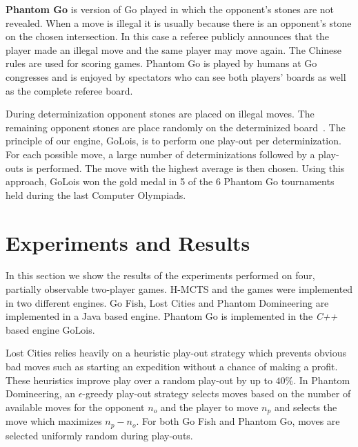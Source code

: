 \documentclass[a4paper]{llncs}
\begin{document}
{\sc \bf Phantom Go} is version of Go played in which the opponent's stones are not revealed. When a move is illegal it is usually because there is an opponent's stone on the chosen intersection. In this case a referee publicly announces that the player made an illegal move and the same player may move again. The Chinese rules are used for scoring games. Phantom Go is played by humans at Go congresses and is enjoyed by spectators who can see both players' boards as well as the complete referee board.

During determinization opponent stones are placed on illegal moves. The remaining opponent stones are place randomly on the determinized board~\cite{cazenave06}. The principle of our engine, {\sc GoLois}, is to perform one play-out per determinization. For each possible move, a large number of determinizations followed by a play-outs is performed. The move with the highest average is then chosen. Using this approach, {\sc GoLois} won the gold medal in 5 of the 6 Phantom Go tournaments held during the last Computer Olympiads.

\section{Experiments and Results}
\label{sec:exp_res}
In this section we show the results of the experiments performed on four, partially observable two-player games. H-MCTS and the games were implemented in two different engines. Go Fish, Lost Cities and Phantom Domineering are implemented in a Java based engine. Phantom Go is implemented in the \emph{C++} based engine {\sc GoLois}.

Lost Cities relies heavily on a heuristic play-out strategy which prevents obvious bad moves such as starting an expedition without a chance of making a profit. These heuristics improve play over a random play-out by up to $40\%$. In Phantom Domineering, an $\epsilon$-greedy play-out strategy selects moves based on the number of available moves for the opponent $n_o$ and the player to move $n_p$ and selects the move which maximizes $n_p - n_o$. For both Go Fish and Phantom Go, moves are selected uniformly random during play-outs.
\end{document}
